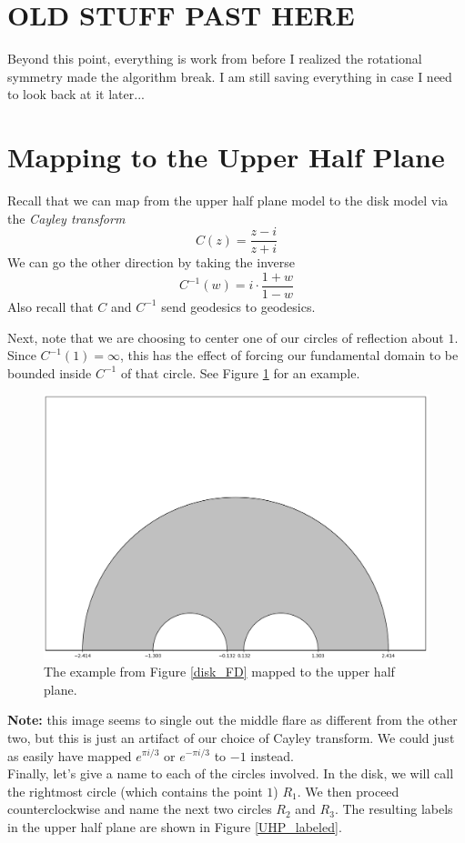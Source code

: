 \documentclass[]{article}
\begin{document}
\clearpage

\section*{OLD STUFF PAST HERE}

Beyond this point, everything is work from before I realized the rotational symmetry made the algorithm break.
I am still saving everything in case I need to look back at it later...

\section*{Mapping to the Upper Half Plane}

Recall that we can map from the upper half plane model to the disk model via the \textit{Cayley transform}
$$
C(z) = \frac{z - i}{z + i}
$$
We can go the other direction by taking the inverse
$$
C^{-1}(w) = i\cdot\frac{1 + w}{1 - w}
$$
Also recall that $C$ and $C^{-1}$ send geodesics to geodesics.

Next, note that we are choosing to center one of our circles of reflection about $1$.
Since $C^{-1}(1) = \infty$, this has the effect of forcing our fundamental domain to be bounded inside $C^{-1}$ of that circle.
See Figure \ref{UHP_FD} for an example.

\begin{figure}[h]
	\centering
	\includegraphics[width=0.6\linewidth]{UHP_FD.png}
	\caption{The example from Figure \ref{disk_FD} mapped to the upper half plane.}
	\label{UHP_FD}
\end{figure}

\textbf{Note:} this image seems to single out the middle flare as different from the other two, but this is just an artifact of our choice of Cayley transform.
We could just as easily have mapped $e^{\pi i/3}$ or $e^{-\pi i/3}$ to $-1$ instead.
\\

Finally, let's give a name to each of the circles involved.
In the disk, we will call the rightmost circle (which contains the point $1$) $R_1$.
We then proceed counterclockwise and name the next two circles $R_2$ and $R_3$.
The resulting labels in the upper half plane are shown in Figure \ref{UHP_labeled}.
\end{document}
